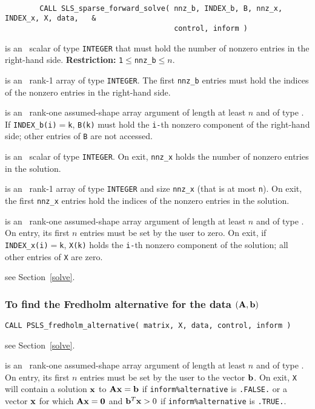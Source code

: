 \documentclass{galahad}
\newcommand{\packagename}{PSLS}
\begin{document}
{\tt
\begin{verbatim}
        CALL SLS_sparse_forward_solve( nnz_b, INDEX_b, B, nnz_x, INDEX_x, X, data,   &
                                       control, inform )
\end{verbatim}
}
\vspace*{-4mm}
\begin{description}
 is an \intentin\ scalar of type  {\tt INTEGER} that
must hold the number of nonzero entries in the right-hand side.
{\bf Restriction:} {\tt 1$\le$nnz\_b$\le n$}.

  is an  \intentin\ rank-1 array of type {\tt INTEGER}.
The first {\tt nnz\_b} entries must hold the indices of the nonzero entries
in the right-hand side.

 is an  \intentin\ rank-one assumed-shape array argument of
length at least $n$ and of type \realdp.
If {\tt INDEX\_b(i)}$=${\tt k}, {\tt B(k)} must hold the {\tt i-}th
nonzero component of the right-hand side; other entries of {\tt B}
are not accessed.

  is an  \intentout\ scalar  of type  {\tt INTEGER}.
On exit, {\tt nnz\_x} holds the number of nonzero entries in the solution.

  is an  \intentout\ rank-1  array of type {\tt INTEGER} and
size {\tt nnz\_x} (that is at most {\tt n}). On exit, the first
{\tt nnz\_x} entries hold the indices of the nonzero entries in the solution.

 is an  \intentinout\ rank-one assumed-shape array argument of
length at least $n$ and of type \realdp.
On entry, its first $n$ entries must be set by the user to zero.
On exit, if {\tt INDEX\_x(i)}$=${\tt k}, {\tt X(k)} holds the {\tt i-}th
nonzero component of the solution; all other entries of {\tt X} are zero.

 see Section~\ref{solve}.

\end{description}

\subsubsection{To find the Fredholm alternative for the data $({\mathbf{A}},{\mathbf{b}})$}
\label{fredholm}

\hskip0.5in
{\tt CALL \packagename\_fredholm\_alternative( matrix, X, data, control,
 inform )}

\begin{description}

see Section~\ref{solve}.

 is an \intentinout\ rank-one assumed-shape array argument of
length at least $n$ and of type \realdp.
On entry, its first $n$ entries must be set by the user to the vector ${\mathbf{b}}$.
On exit, {\tt X} will contain a solution ${\mathbf{x}}$ to ${\mathbf{A}} {\mathbf{x}} = {\mathbf{b}}$ if
{\tt inform\%alternative} is {\tt .FALSE.} or a vector ${\mathbf{x}}$ for which
${\mathbf{A}} {\mathbf{x}} = {\mathbf{0}}$ and ${\mathbf{b}}^T {\mathbf{x}} > 0$ if
{\tt inform\%alternative} is {\tt .TRUE.}.
\end{description}
\end{document}
